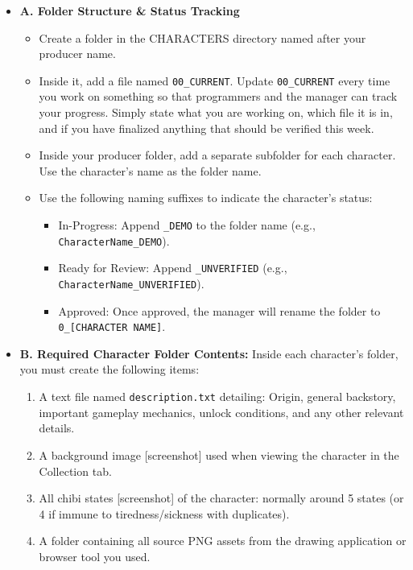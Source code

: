 \documentclass[11pt,a4paper]{article}
\begin{document}
\begin{itemize}[leftmargin=*, nosep]
    \item \textbf{A. Folder Structure \& Status Tracking}
    \begin{itemize}
        \item Create a folder in the CHARACTERS directory named after your producer name.
        \item Inside it, add a file named \texttt{00\_CURRENT}. Update \texttt{00\_CURRENT} every time you work on something so that programmers and the manager can track your progress. Simply state what you are working on, which file it is in, and if you have finalized anything that should be verified this week.
        \item Inside your producer folder, add a separate subfolder for each character. Use the character's name as the folder name.
        \item Use the following naming suffixes to indicate the character's status:
        \begin{itemize}
            \item In-Progress: Append \texttt{\_DEMO} to the folder name (e.g., \texttt{CharacterName\_DEMO}).
            \item Ready for Review: Append \texttt{\_UNVERIFIED} (e.g., \texttt{CharacterName\_UNVERIFIED}).
            \item Approved: Once approved, the manager will rename the folder to \texttt{0\_[CHARACTER NAME]}.
        \end{itemize}
    \end{itemize}
    \vspace{0.2cm}
    \item \textbf{B. Required Character Folder Contents:} Inside each character's folder, you must create the following items:
    \begin{enumerate}
        \item A text file named \texttt{description.txt} detailing: Origin, general backstory, important gameplay mechanics, unlock conditions, and any other relevant details.
        \item A background image [screenshot] used when viewing the character in the Collection tab.
        \item All chibi states [screenshot] of the character: normally around 5 states (or 4 if immune to tiredness/sickness with duplicates).
        \item A folder containing all source PNG assets from the drawing application or browser tool you used.

\end{enumerate}
\end{itemize}
\end{document}
